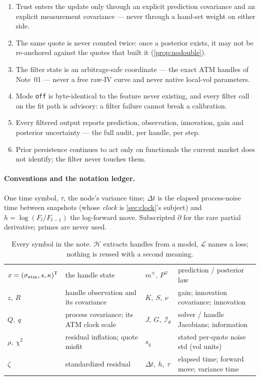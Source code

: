 \documentclass[11pt]{article}
\newcommand{\calL}{\mathcal L}
\newcommand{\calI}{\mathcal I}
\newcommand{\calH}{\mathcal H}
\begin{document}
\begin{invariant}
\begin{enumerate}[leftmargin=1.6em]
\item Trust enters the update only through an explicit prediction
covariance and an explicit measurement covariance --- never through a
hand-set weight on either side.
\item The same quote is never counted twice: once a posterior exists, it
may not be re-anchored against the quotes that built it
(\cref{prop:nodouble}).
\item The filter state is an arbitrage-safe coordinate --- the exact ATM
handles of Note~01 --- never a free raw-IV curve and never native
local-vol parameters.
\item Mode \texttt{off} is byte-identical to the feature never existing,
and every filter call on the fit path is advisory: a filter failure
cannot break a calibration.
\item Every filtered output reports prediction, observation, innovation,
gain and posterior uncertainty --- the full audit, per handle, per step.
\item Prior persistence continues to act only on functionals the current
market does not identify; the filter never touches them.
\end{enumerate}
\end{invariant}

\paragraph{Conventions and the notation ledger.}
One time symbol, $\tau$, the node's variance time; $\Delta t$ is the
elapsed process-noise time between snapshots (whose \emph{clock} is
\cref{sec:clock}'s subject) and $h=\log(F_t/F_{t-1})$ the log-forward
move.  Subscripted $\partial$ for the rare partial derivative; primes are
never used.

\begin{table}[H]
\centering\footnotesize
\setlength{\tabcolsep}{3pt}
\begin{tabular}{@{}llll@{}}
\toprule
$x=(\sigma_{\mathrm{atm}},s,\kappa)^{\mathsf{T}}$ & the handle state &
$m^{\mp},\,P^{\mp}$ & prediction / posterior law\\[2pt]
$z,\ R$ & handle observation and its covariance &
$K,\ S,\ \nu$ & gain; innovation covariance; innovation\\[2pt]
$Q,\ q$ & process covariance; its ATM clock scale &
$J,\ G,\ \calI_\theta$ & solver / handle Jacobians; information\\[2pt]
$\rho,\ \chi^2$ & residual inflation; quote misfit &
$s_q$ & stated per-quote noise std (vol units)\\[2pt]
$\zeta$ & standardized residual &
$\Delta t,\ h,\ \tau$ & elapsed time; forward move; variance time\\
\bottomrule
\end{tabular}
\caption{Every symbol in the note.  $\calH$ extracts handles from a
model, $\calL$ names a loss; nothing is reused with a second meaning.}
\label{tab:ledger}
\end{table}
\end{document}
